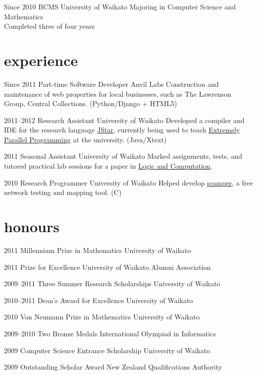 \documentclass[]{boris-cv}
\begin{document}
\begin{entrylist}
  \entry
    {Since 2010}
    {BCMS }
    {University of Waikato}
    {Majoring in Computer Science and Mathematics\\Completed three of four years}
\end{entrylist}

\section{experience}

\begin{entrylist}
  \entry
    {Since 2011}
    {Part-time Software Developer}
    {Anvil Labs}
    {Construction and maintenance of web properties for local businesses,
		such as The Lawrenson Group, Central Collections. (Python/Django + HTML5)}

  \entry
    {2011--2012}
    {Research Assistant}
    {University of Waikato}
    {Developed a compiler and IDE for the research language
    \href{http://www.cs.waikato.ac.nz/research/jstar/}{JStar}, currently being used to teach
    \href{http://papers.waikato.ac.nz/subjects/COMP/COMP553}
    {Extremely Parallel Programming} at the university. (Java/Xtext)}

  \entry
    {2011}
    {Seasonal Assistant}
    {University of Waikato}
    {Marked assignments, tests, and tutored
    practical lab sessions for a paper in 
    \href{http://papers.waikato.ac.nz/subjects/COMP/COMP235}
    {Logic and Computation}.}

  \entry
    {2010}
    {Research Programmer}
    {University of Waikato}
    {Helped develop
    \href{http://www.wand.net.nz/scamper}{scamper},
    a free network testing and mapping tool. (C)}
\end{entrylist}

\pagebreak

\section{honours}
\begin{entrylist}
  \titleentry
    {2011}
    {Millennium Prize in Mathematics}
    {University of Waikato}

  \titleentry
    {2011}
    {Prize for Excellence}
    {University of Waikato Alumni Association}

  \titleentry
    {2009--2011}
    {Three Summer Research Scholarships}
    {University of Waikato}

  \titleentry
    {2010--2011}
    {Dean's Award for Excellence}
    {University of Waikato}

  \titleentry
    {2010}
    {Von Neumann Prize in Mathematics}
    {University of Waikato}

  \titleentry
    {2009--2010}
    {Two Bronze Medals}
    {International Olympiad in Informatics}

  \titleentry
    {2009}
    {Computer Science Entrance Scholarship}
    {University of Waikato}

  \titleentry
    {2009}
    {Outstanding Scholar Award}
    {New Zealand Qualifications Authority}
\end{entrylist}
\end{document}
